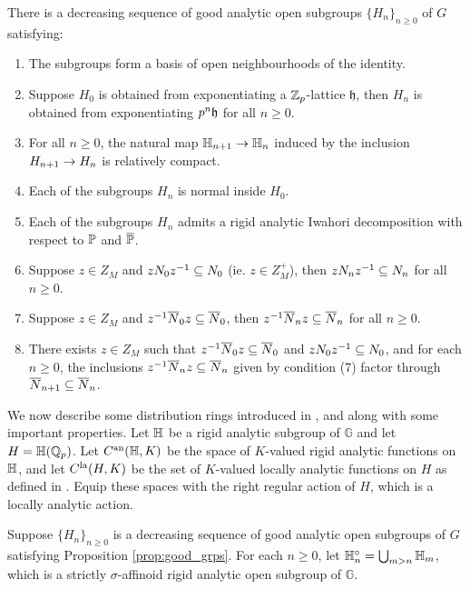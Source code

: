 \documentclass[10pt]{amsart}
\begin{document}
\begin{proposition}\cite[Prop. 4.1.6]{Jacquet1}\label{prop:good_grps}
There is a decreasing sequence of good analytic open subgroups $\{H_{n}\}_{n\geq 0}$ of $G$ satisfying:
\begin{enumerate}
    \item The subgroups form a basis of open neighbourhoods of the identity. 
    \item Suppose $H_{0}$ is obtained from exponentiating a $\zp$-lattice $\mathfrak{h}$, then $H_{n}$ is obtained from exponentiating $p^{n}\H$ for all $n\geq 0$. 
    \item For all $n\geq 0$, the natural map $\h_{n+1}\ra \h_{n}$ induced by the inclusion $H_{n+1}\ra H_{n}$ is relatively compact.
    \item Each of the subgroups $H_{n}$ is normal inside $H_{0}$.
    \item Each of the subgroups $H_{n}$ admits a rigid analytic Iwahori decomposition with respect to $\P$ and $\overline{\P}$. 
    \item Suppose $z\in Z_{M}$ and $zN_{0}z^{-1}\sub N_{0}$ (ie. $z\in Z_{M}^{+}$), then $zN_{n}z^{-1}\sub N_{n}$ for all $n\geq 0$.
    \item Suppose $z\in Z_{M}$ and $z^{-1}\overline{N}_{0}z\sub \overline{N}_{0}$, then $z^{-1}\overline{N}_{n}z\sub \overline{N}_{n}$ for all $n\geq 0$. 
    \item There exists $z\in Z_{M}$ such that $z^{-1}\overline{N}_{0}z\sub \overline{N}_{0}$ and $zN_{0}z^{-1}\sub N_{0}$, and for each $n\geq 0$, the inclusions $z^{-1}\overline{N}_{n}z\sub\overline{N}_{n}$ given by condition (7) factor through $\overline{N}_{n+1}\sub\overline{N}_{n}$. 
\end{enumerate}
\end{proposition}


We now describe some distribution rings introduced in \cite{analytic}, \cite{ST_dist} and \cite{ST_GL2} along with some important properties. Let $\h$ be a rigid analytic subgroup of $\mathbb{G}$ and let $H=\h(\qp)$. Let $C^{\an}(\h,K)$ be the space of $K$-valued rigid analytic functions on $\h$, and let $C^{\La}(H,K)$ be the set of $K$-valued locally analytic functions on $H$ as defined in \cite{analytic}. Equip these spaces with the right regular action of $H$, which is a locally analytic action. 

Suppose $\{H_{n}\}_{n\geq 0}$ is a decreasing sequence of good analytic open subgroups of $G$ satisfying Proposition \ref{prop:good_grps}. For each $n\geq 0$, let $\h^{\circ}_{n}=\bigcup_{m>n} \h_{m}$, which is a strictly $\sigma$-affinoid rigid analytic open subgroup of $\mathbb{G}$. 
\end{document}
